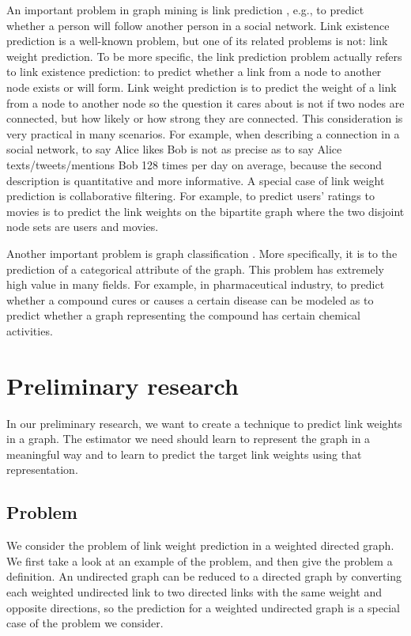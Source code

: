 \documentclass{article}
\begin{document}
An important problem in graph mining is link prediction \cite{liben2007link},
e.g., to predict whether a person will follow another person in a social network.
Link existence prediction is a well-known problem,
but one of its related problems is not: link weight prediction.
To be more specific,
the link prediction problem actually refers to link existence prediction:
to predict whether a link from a node to another node exists or will form.
Link weight prediction is
to predict the weight of a link from a node to another node
so the question it cares about is not if two nodes are connected,
but how likely or how strong they are connected.
This consideration is very practical in many scenarios.
For example, when describing a connection in a social network,
to say Alice likes Bob is not as precise as
to say Alice texts/tweets/mentions Bob 128 times per day on average,
because the second description is quantitative and more informative.
A special case of link weight prediction is collaborative filtering.
For example, to predict users' ratings to movies
is to predict the link weights on the bipartite graph
where the two disjoint node sets are users and movies.

Another important problem is graph classification \cite{duda2012pattern}.
More specifically, it is to the prediction of a categorical attribute of the graph.
This problem has extremely high value in many fields.
For example, in pharmaceutical industry,
to predict whether a compound cures or causes a certain disease
can be modeled as to predict whether a graph representing the compound
has certain chemical activities.

\section{Preliminary research}
In our preliminary research,
we want to create a technique to predict link weights in a graph.
The estimator we need should learn to represent the graph in a meaningful way
and to learn to predict the target link weights using that representation.

\subsection{Problem}
We consider the problem of link weight prediction in a weighted directed graph.
We first take a look at an example of the problem,
and then give the problem a definition.
An undirected graph can be reduced to a directed graph by converting each weighted undirected link to two directed links with the same weight and opposite directions,
so the prediction for a weighted undirected graph is a special case of the problem we consider.
\end{document}
